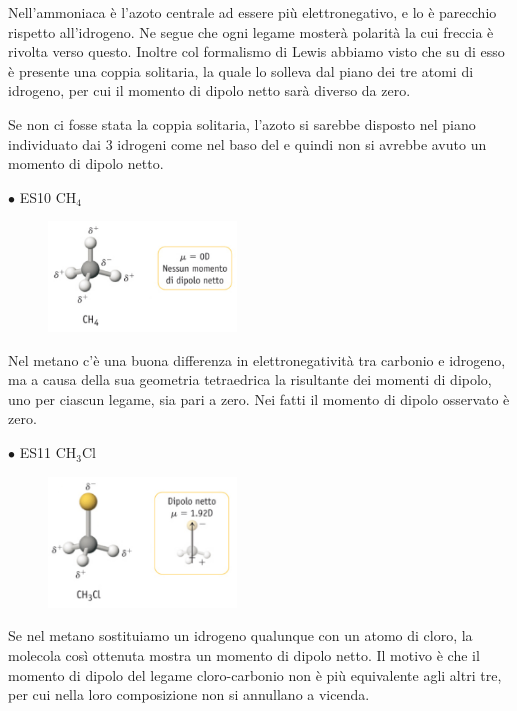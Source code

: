 \vspace{-0.4cm}Nell'ammoniaca è l'azoto centrale ad essere più elettronegativo, e lo è parecchio rispetto all'idrogeno. Ne segue che ogni legame mosterà polarità la cui freccia è rivolta verso questo. Inoltre col formalismo di Lewis abbiamo visto che su di esso è presente una coppia solitaria, la quale lo solleva dal piano dei tre atomi di idrogeno, per cui il momento di dipolo netto sarà diverso da zero.

Se non ci fosse stata la coppia solitaria, l'azoto si sarebbe disposto nel piano individuato dai 3 idrogeni come nel baso del  e quindi non si avrebbe avuto un momento di dipolo netto.

\vspace{0.2cm}$\bullet$ ES10 CH$_4$

\begin{minipage}{0.5\textwidth}
\begin{figure}[H]
\includegraphics[width=5cm]{immagini/CH_4.png}
\end{figure}
\end{minipage} \hfill
\begin{minipage}{0.5\textwidth}
 Nel metano c'è una buona differenza in elettronegatività tra carbonio e idrogeno, ma a causa della sua geometria tetraedrica la risultante dei momenti di dipolo, uno per ciascun legame, sia pari a zero. Nei fatti il momento di dipolo osservato è zero.
\end{minipage}

\vspace{0.2cm}$\bullet$ ES11 CH$_3$Cl

\begin{minipage}{0.5\textwidth}
\begin{figure}[H]
\includegraphics[width=5cm]{immagini/CH_3Cl.png}
\end{figure}
\end{minipage} \hfill
\begin{minipage}{0.5\textwidth}
Se nel metano sostituiamo un idrogeno qualunque con un atomo di cloro, la molecola così ottenuta mostra un momento di dipolo netto. Il motivo è che il momento di dipolo del legame cloro-carbonio non è più equivalente agli altri tre, per cui nella loro composizione non si annullano a vicenda.
\end{minipage}

